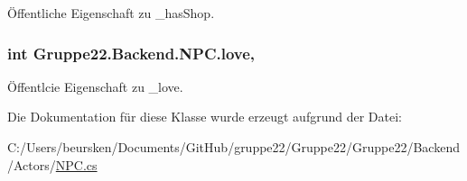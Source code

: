Öffentliche Eigenschaft zu \-\_\-has\-Shop. 

\hypertarget{class_gruppe22_1_1_backend_1_1_n_p_c_a6bdbcf8d62b4bc5605e7949012197908}{
\subsubsection[{love}]{\setlength{\rightskip}{0pt plus 5cm}int Gruppe22.\-Backend.\-N\-P\-C.\-love\hspace{0.3cm}{\ttfamily [get]}, {\ttfamily [set]}}}\label{class_gruppe22_1_1_backend_1_1_n_p_c_a6bdbcf8d62b4bc5605e7949012197908}


Öffentlcie Eigenschaft zu \-\_\-love. 



Die Dokumentation für diese Klasse wurde erzeugt aufgrund der Datei\-:\begin{DoxyCompactItemize}
\item 
C\-:/\-Users/beursken/\-Documents/\-Git\-Hub/gruppe22/\-Gruppe22/\-Gruppe22/\-Backend/\-Actors/\hyperlink{_n_p_c_8cs}{N\-P\-C.\-cs}\end{DoxyCompactItemize}
